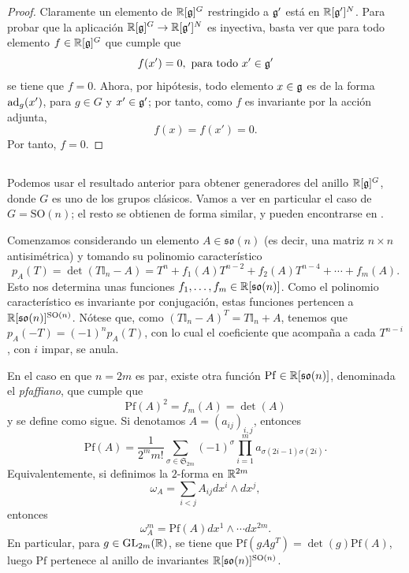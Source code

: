 \documentclass[11pt,a4paper]{amsbook}
\theoremstyle{remark} \newtheorem{rmk}[subsection]{Observación}
\theoremstyle{definition} \newtheorem{defn}[subsection]{Definición}
\theoremstyle{definition} \newtheorem{ex}[subsection]{Ejemplo}
\theoremstyle{definition} \newtheorem{ej}[subsection]{Ejercicio}
\begin{document}
\begin{proof}
Claramente un elemento de $\mathbb R[\mathfrak{g}]^G$ restringido a $\mathfrak{g}'$ está en $\mathbb R[\mathfrak{g}']^N$. Para probar que la aplicación $\mathbb R[\mathfrak{g}]^G\rightarrow \mathbb R[\mathfrak{g}']^N$ es inyectiva, basta ver que para todo elemento $f\in \mathbb R[\mathfrak{g}]^G$ que cumple que
\begin{equation*}
f(x') = 0, \ \text{para todo } x' \in \mathfrak{g}'
\end{equation*}
se tiene que $f=0$. Ahora, por hipótesis, todo elemento $x\in \mathfrak{g}$ es de la forma $\operatorname{ad}_g(x')$, para $g\in G$ y $x'\in \mathfrak{g}'$; por tanto, como $f$ es invariante por la acción adjunta,
\begin{equation*}
f(x) = f(x')=0.
\end{equation*}
Por tanto, $f=0$.
\end{proof}

\subsection{}
Podemos usar el resultado anterior para obtener generadores del anillo $\mathbb R[\mathfrak{g}]^G$, donde $G$ es uno de los grupos clásicos. Vamos a ver en particular el caso de $G=\mathrm{SO}(n)$; el resto se obtienen de forma similar, y pueden encontrarse en .

Comenzamos considerando un elemento $A\in \mathfrak{so}(n)$ (es decir, una matriz $n\times n$ antisimétrica) y tomando su polinomio característico
\begin{equation*}
p_A(T) = \det(T \mathbb{I}_n - A) = T^n + f_1(A) T^{n-2} + f_2(A) T^{n-4} + \cdots + f_m(A).
\end{equation*}
Esto nos determina unas funciones $f_1,\dots,f_m \in \mathbb R[\mathfrak{so}(n)]$. Como el polinomio característico es invariante por conjugación, estas funciones pertencen a $\mathbb R[\mathfrak{so}(n)]^{\mathrm{SO}(n)}$.  Nótese que, como $(T \mathbb{I}_n - A)^T = T \mathbb{I}_n + A$, tenemos que $p_A(-T)=(-1)^n p_A(T)$, con lo cual el coeficiente que acompaña a cada $T^{n-i}$, con $i$ impar, se anula.

En el caso en que $n=2m$ es par, existe otra función $\mathrm{Pf}\in \mathbb R[\mathfrak{so}(n)]$, denominada el \emph{pfaffiano}, que cumple que
\begin{equation*}
\mathrm{Pf}(A)^2 = f_m(A) = \det(A)
\end{equation*}
y se define como sigue. Si denotamos $A=(a_{ij})_{i,j}$, entonces
\begin{equation*}
\mathrm{Pf}(A) = \frac{1}{2^m m!} \sum_{\sigma \in \mathfrak{S}_{2m}} (-1)^\sigma \prod_{i=1}^m a_{\sigma(2i-1)\sigma(2i)}.
\end{equation*}
Equivalentemente, si definimos la $2$-forma en $\mathbb R^{2m}$
\begin{equation*}
\omega_A = \sum_{i<j} A_{ij} dx^i \wedge dx^j,
\end{equation*}
entonces
\begin{equation*}
\omega_A^{m} = \mathrm{Pf}(A) dx^1 \wedge \cdots dx^{2m}.
\end{equation*}
En particular, para $g\in \mathrm{GL}_{2m}(\mathbb R)$, se tiene que $\mathrm{Pf}(gAg^T)=\det(g)\mathrm{Pf}(A)$, luego $\mathrm{Pf}$ pertenece al anillo de invariantes $\mathbb R[\mathfrak{so}(n)]^{\mathrm{SO}(n)}$.
\end{document}
